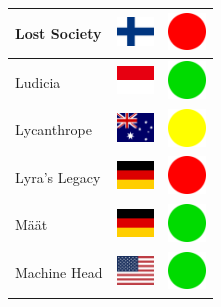 \documentclass[12pt, a4paper, twoside]{report}
\begin{document}
\begin{center}
\begin{longtable}{|p{5cm}|p{2cm}|p{2cm}|}
Lost Society & \includegraphics[width=1cm]{4x3/fi} & \includegraphics[width=1cm]{likes/n} \\ \hline
Ludicia & \includegraphics[width=1cm]{4x3/id} & \includegraphics[width=1cm]{likes/y} \\ \hline
Lycanthrope & \includegraphics[width=1cm]{4x3/au} & \includegraphics[width=1cm]{likes/m} \\ \hline
Lyra's Legacy & \includegraphics[width=1cm]{4x3/de} & \includegraphics[width=1cm]{likes/n} \\ \hline
Määt & \includegraphics[width=1cm]{4x3/de} & \includegraphics[width=1cm]{likes/y} \\ \hline
Machine Head & \includegraphics[width=1cm]{4x3/us} & \includegraphics[width=1cm]{likes/y} \\ \hline

\end{longtable}
\end{center}
\end{document}
